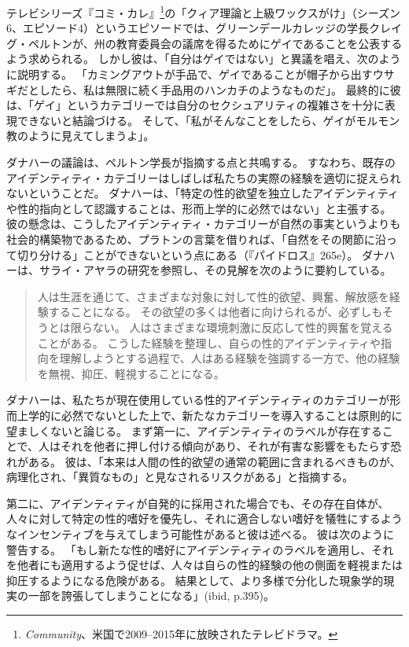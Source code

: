 \documentclass[paper=a4,book,openany]{jlreq}
\begin{document}
テレビシリーズ『コミ・カレ』\footnote{\emph{Community}、米国で2009--2015年に放映されたテレビドラマ。}の「クィア理論と上級ワックスがけ」（シーズン6、エピソード4）というエピソードでは、グリーンデールカレッジの学長クレイグ・ペルトンが、州の教育委員会の議席を得るためにゲイであることを公表するよう求められる。
しかし彼は、「自分はゲイではない」と異議を唱え、次のように説明する。
「カミングアウトが手品で、ゲイであることが帽子から出すウサギだとしたら、私は無限に続く手品用のハンカチのようなものだ」。
最終的に彼は、「ゲイ」というカテゴリーでは自分のセクシュアリティの複雑さを十分に表現できないと結論づける。
そして、「私がそんなことをしたら、ゲイがモルモン教のように見えてしまうよ」。

ダナハーの議論は、ペルトン学長が指摘する点と共鳴する。
すなわち、既存のアイデンティティ・カテゴリーはしばしば私たちの実際の経験を適切に捉えられないということだ。
ダナハーは、「特定の性的欲望を独立したアイデンティティや性的指向として認識することは、形而上学的に必然ではない」と主張する\citep[p.393]{danaher20:_sexual}。
彼の懸念は、こうしたアイデンティティ・カテゴリーが自然の事実というよりも社会的構築物であるため、プラトンの言葉を借りれば、「自然をその関節に沿って切り分ける」ことができないという点にある（『パイドロス』265e）。
ダナハーは、サライ・アヤラの研究\citep{ayala18:_sexual_orien_choic}を参照し、その見解を次のように要約している。

\begin{quote}
人は生涯を通じて、さまざまな対象に対して性的欲望、興奮、解放感を経験することになる。
その欲望の多くは他者に向けられるが、必ずしもそうとは限らない。
人はさまざまな環境刺激に反応して性的興奮を覚えることがある。
こうした経験を整理し、自らの性的アイデンティティや指向を理解しようとする過程で、人はある経験を強調する一方で、他の経験を無視、抑圧、軽視することになる。
\citep{danaher20:_sexual}
\end{quote}

ダナハーは、私たちが現在使用している性的アイデンティティのカテゴリーが形而上学的に必然でないとした上で、新たなカテゴリーを導入することは原則的に望ましくないと論じる。
まず第一に、アイデンティティのラベルが存在することで、人はそれを他者に押し付ける傾向があり、それが有害な影響をもたらす恐れがある。
彼は、「本来は人間の性的欲望の通常の範囲に含まれるべきものが、病理化され、「異質なもの」と見なされるリスクがある」と指摘する\citep[p.393]{danaher20:_sexual}。

第二に、アイデンティティが自発的に採用された場合でも、その存在自体が、人々に対して特定の性的嗜好を優先し、それに適合しない嗜好を犠牲にするようなインセンティブを与えてしまう可能性があると彼は述べる。
彼は次のように警告する。
「もし新たな性的嗜好にアイデンティティのラベルを適用し、それを他者にも適用するよう促せば、人々は自らの性的経験の他の側面を軽視または抑圧するようになる危険がある。
結果として、より多様で分化した現象学的現実の一部を誇張してしまうことになる」(ibid, p.395)。
\end{document}
